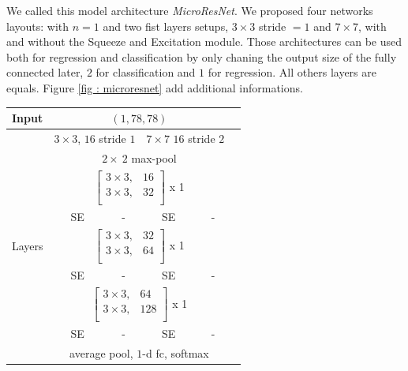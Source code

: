 \documentclass[../document.tex]{subfiles}
\begin{document}
We called this model architecture \emph{MicroResNet}. We proposed four networks layouts: with $n=1$ and two fist layers setups, $3\times3$ stride $=1$ and $7\times7$, with and without the Squeeze and Excitation module. Those architectures can be used both for regression and classification by only chaning the output size of the fully connected later, $2$ for classification and $1$ for regression. All others layers are equals. Figure \ref{fig : microresnet} add additional informations.
\begin{table}[htbp]
    \centering
        \begin{tabular}{@{}l|c|c|c|cc@{}}
        \hline
             Input   &  \multicolumn{4}{c}{$(1,78,78)$}  \\ 
            \hline 
            \multirow{12}{*}{Layers} & \multicolumn{2}{c}{$3 \times 3$, $16$ stride $1$} & \multicolumn{2}{c}{$7 \times 7$ $16$ stride $2$} \\
            \cline{2-5}
            &\multicolumn{4}{c}{$2 \times \ 2$ max-pool} \\ 
            \cline{2-5}
            &  \multicolumn{4}{c}{$\begin{bmatrix}
                3  \times 3, & 16 \\
                3  \times  3, & 32 \\  
               \end{bmatrix}$ x 1} \\ 
               \cline{2-5}
               &  SE & - & SE & -\\ 
               \cline{2-5}
               &  \multicolumn{4}{c}{$\begin{bmatrix}
                3  \times 3, & 32 \\
                3  \times  3, & 64 \\  
               \end{bmatrix}$ x 1} \\ 
               \cline{2-5}
               &  SE & - & SE & -\\ 
               \cline{2-5}

               &  \multicolumn{4}{c}{$\begin{bmatrix}
                3  \times 3, & 64 \\
                3  \times  3, & 128 \\  
               \end{bmatrix}$ x 1} \\
               \hline
               &  SE & - & SE & -\\ 
               \cline{2-5}
               &  \multicolumn{4}{c}{average pool, $1$-d fc, softmax} \\ 
               \hline
        

\end{tabular}
\end{table}
\end{document}
